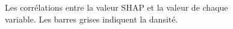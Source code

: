 \documentclass[
  oneside,
  open=any]{scrreprt}
\begin{document}
\begin{figure}[H]


\caption{\label{fig-scatter}Les corrélations entre la valeur SHAP et la
valeur de chaque variable. Les barres grises indiquent la dansité.}

\end{figure}%
\end{document}
